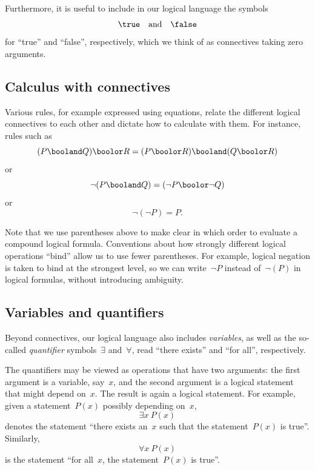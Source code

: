 Furthermore, it is useful to include in our logical language the symbols
\begin{equation}
    \true \quad \text{and} \quad \false
\end{equation}
for ``true'' and ``false'', respectively, which we think of as connectives taking zero arguments.

\subsection{Calculus with connectives}

Various rules, for example expressed using equations, relate the different logical connectives to each other and dictate how to calculate with them.
For instance, rules such as
\begin{equation}
    (P \booland Q) \boolor R
    =
    (P \boolor R) \booland (Q \boolor R)
\end{equation}
or
\begin{equation}
    \lnot (P \booland Q) = (\lnot P \boolor \lnot Q)
\end{equation}
or
\begin{equation}
    \lnot (\lnot P) = P.
\end{equation}

Note that we use parentheses above to make clear in which order to evaluate a compound logical formula.
Conventions about how strongly different logical operations ``bind'' allow us to use fewer parentheses.
For example, logical negation is taken to bind at the strongest level, so we can write~$\lnot P$ instead of~$\lnot (P)$ in logical formulas, without introducing ambiguity.

\subsection{Variables and quantifiers}

Beyond connectives, our logical language also includes \emph{variables}, as well as the so-called \emph{quantifier} symbols~$\exists$ and~$\forall$, read ``there exists'' and ``for all'', respectively.

The quantifiers may be viewed as operations that have two arguments:
the first argument is a variable, say~$x$, and the second argument is a logical statement that might depend on~$x$.
The result is again a logical statement.
For example, given a statement~$P(x)$ possibly depending on~$x$,
\begin{equation}
    \exists x \ P(x)
\end{equation}
denotes the statement ``there exists an~$x$ such that the statement~$P(x)$ is true''.
Similarly,
\begin{equation}
    \forall x \ P(x)
\end{equation}
is the statement ``for all~$x$, the statement~$P(x)$ is true''.

